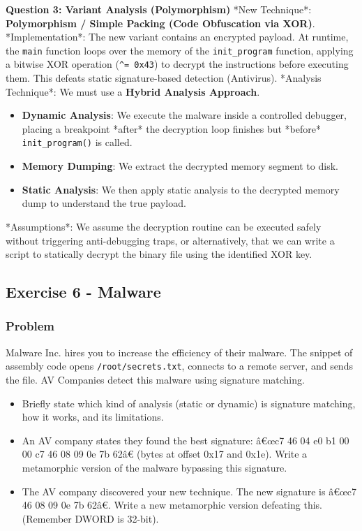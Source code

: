 \documentclass{article}
\begin{document}
\textbf{Question 3: Variant Analysis (Polymorphism)}
*New Technique*: \textbf{Polymorphism / Simple Packing (Code Obfuscation via XOR)}.
*Implementation*: The new variant contains an encrypted payload. At runtime, the \texttt{main} function loops over the memory of the \texttt{init\_program} function, applying a bitwise XOR operation (\texttt{\textasciicircum{}= 0x43}) to decrypt the instructions before executing them. This defeats static signature-based detection (Antivirus).
*Analysis Technique*: We must use a \textbf{Hybrid Analysis Approach}.
\begin{itemize}
    \item[\textbf{1.}] \textbf{Dynamic Analysis}: We execute the malware inside a controlled debugger, placing a breakpoint *after* the decryption loop finishes but *before* \texttt{init\_program()} is called.
    \item[\textbf{2.}] \textbf{Memory Dumping}: We extract the decrypted memory segment to disk.
    \item[\textbf{3.}] \textbf{Static Analysis}: We then apply static analysis to the decrypted memory dump to understand the true payload.
\end{itemize}
*Assumptions*: We assume the decryption routine can be executed safely without triggering anti-debugging traps, or alternatively, that we can write a script to statically decrypt the binary file using the identified XOR key.

\subsection{Exercise 6 - Malware}
\subsubsection*{Problem}
Malware Inc. hires you to increase the efficiency of their malware. The snippet of assembly code opens \texttt{/root/secrets.txt}, connects to a remote server, and sends the file.
AV Companies detect this malware using signature matching.
\begin{itemize}
    \item[\textbf{1.}] [1 Point] Briefly state which kind of analysis (static or dynamic) is signature matching, how it works, and its limitations.
    \item[\textbf{2.}] [2 Point] An AV company states they found the best signature: â€œc7 46 04 e0 b1 00 00 c7 46 08 09 0e 7b 62â€ (bytes at offset 0x17 and 0x1e). Write a metamorphic version of the malware bypassing this signature.
    \item[\textbf{3.}] [3 Points] The AV company discovered your new technique. The new signature is â€œc7 46 08 09 0e 7b 62â€. Write a new metamorphic version defeating this. (Remember DWORD is 32-bit).
\end{itemize}
\end{document}
